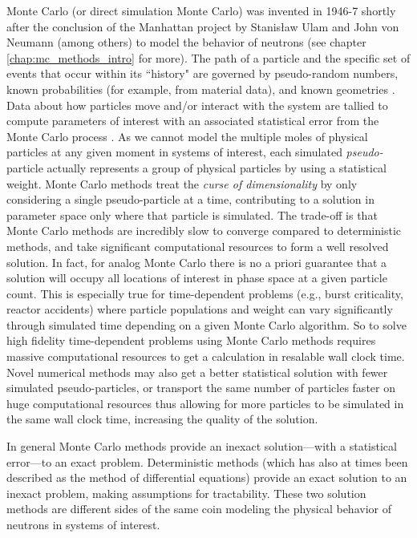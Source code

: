 Monte Carlo (or direct simulation Monte Carlo) was invented in 1946-7 shortly after the conclusion of the Manhattan project by Stanisław Ulam and John von Neumann (among others) to model the behavior of neutrons (see chapter \ref{chap:mc_methods_intro} for more).
The path of a particle and the specific set of events that occur within its ``history" are governed by pseudo-random numbers, known probabilities (for example, from material data), and known geometries \cite{lux_1998}.
Data about how particles move and/or interact with the system are tallied to compute parameters of interest with an associated statistical error from the Monte Carlo process \cite{kayla_phd}.
As we cannot model the multiple moles of physical particles at any given moment in systems of interest, each simulated \textit{pseudo-}particle actually represents a group of physical particles by using a statistical weight.
Monte Carlo methods treat the \textit{curse of dimensionality} by only considering a single pseudo-particle at a time, contributing to a solution in parameter space only where that particle is simulated.
The trade-off is that Monte Carlo methods are incredibly slow to converge compared to deterministic methods, and take significant computational resources to form a well resolved solution.
In fact, for analog Monte Carlo there is no a priori guarantee that a solution will occupy all locations of interest in phase space at a given particle count.
This is especially true for time-dependent problems (e.g., burst criticality, reactor accidents) where particle populations and weight can vary significantly through simulated time depending on a given Monte Carlo algorithm.
So to solve high fidelity time-dependent problems using Monte Carlo methods requires massive computational resources to get a calculation in resalable wall clock time.
Novel numerical methods may also get a better statistical solution with fewer simulated pseudo-particles, or transport the same number of particles faster on huge computational resources thus allowing for more particles to be simulated in the same wall clock time, increasing the quality of the solution.

In general Monte Carlo methods provide an inexact solution---with a statistical error---to an exact problem.
Deterministic methods (which has also at times been described as the method of differential equations) provide an exact solution to an inexact problem, making assumptions for tractability.
These two solution methods are different sides of the same coin modeling the physical behavior of neutrons in systems of interest.

